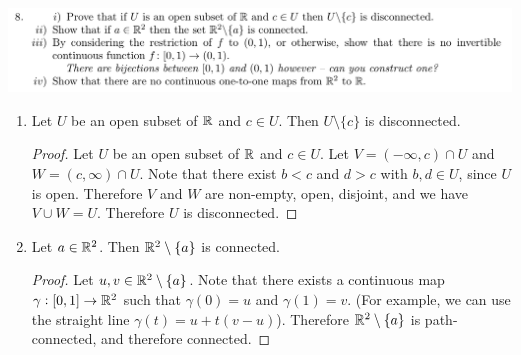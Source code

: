 \documentclass[12pt]{article}
\begin{document}
\begin{mdframed}
\includegraphics[width=400pt]{img/oxford-a2-2-8.png}
\end{mdframed}
\begin{enumerate}[label=(\roman*)]
\item
  \begin{claim*}
    Let $U$ be an open subset of $\mathbb{R}$ and $c \in U$. Then $U \setminus \{c\}$ is disconnected.
  \end{claim*}
  \begin{proof}
    Let $U$ be an open subset of $\mathbb{R}$ and $c \in U$. Let $V = (-\infty, c) \cap U$ and
    $W = (c, \infty) \cap U$. Note that there exist $b < c$ and $d > c$ with $b, d \in U$, since
    $U$ is open. Therefore $V$ and $W$ are non-empty, open, disjoint, and we have $V \cup W =
    U$. Therefore $U$ is disconnected.
  \end{proof}
\item

  \begin{claim*}
    Let $a \in \mathbb{R}^2$. Then $\mathbb{R}^2 \setminus \{a\}$ is connected.
  \end{claim*}
  \begin{proof}
    Let $u, v \in \mathbb{R}^2 \setminus \{a\}$. Note that there exists a continuous map
    $\gamma:[0, 1] \to \mathbb{R}^2$ such that $\gamma(0) = u$ and $\gamma(1) = v$. (For example, we can
    use the straight line $\gamma(t) = u + t(v - u)$). Therefore $\mathbb{R}^2 \setminus \{a\}$ is
    path-connected, and therefore connected.
  \end{proof}





\end{enumerate}
\end{document}
